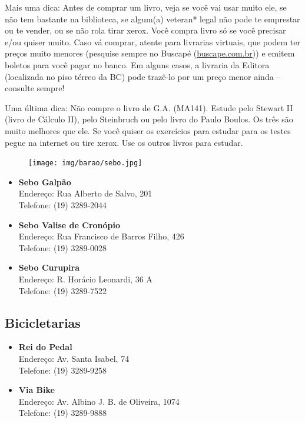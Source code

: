 Mais uma dica: Antes de comprar um livro, veja se você vai usar muito ele, se
não tem bastante na biblioteca, se algum(a) veteran* legal não pode te emprestar ou
te vender, ou se não rola tirar xerox. Você compra livro só se você precisar
e/ou quiser muito. Caso vá comprar, atente para livrarias virtuais, que podem
ter preços muito menores (pesquise sempre no Buscapé (\url{buscape.com.br})) e
emitem boletos para você pagar no banco.  Em alguns casos, a livraria da Editora
(localizada no piso térreo da BC) pode trazê-lo por um preço menor ainda --
consulte sempre!

Uma última dica: Não compre o livro de G.A. (MA141). Estude pelo Stewart II
(livro de Cálculo II), pelo Steinbruch ou pelo livro do Paulo Boulos. Os três
são muito melhores que ele. Se você quiser os exercícios para estudar para os
testes pegue na internet ou tire xerox. Use os outros livros para estudar.

\begin{figure}[h!]
    \centering
    \texttt{[image: img/barao/sebo.jpg]}
\end{figure}

\begin{itemize}
    \item   \textbf{Sebo Galpão}
        \\Endereço: Rua Alberto de Salvo, 201
        \\Telefone: (19) 3289-2044

    \item   \textbf{Sebo Valise de Cronópio}
        \\Endereço: Rua Francisco de Barros Filho, 426
        \\Telefone: (19) 3289-0028

    \item   \textbf{Sebo Curupira}
        \\Endereço: R. Horácio Leonardi, 36 A
        \\Telefone: (19) 3289-7522
\end{itemize}

\subsection{Bicicletarias}

\begin{itemize}
    \item   \textbf{Rei do Pedal}
        \\Endereço: Av. Santa Isabel, 74
        \\Telefone: (19) 3289-9258

    \item   \textbf{Via Bike}
        \\Endereço: Av. Albino J. B. de Oliveira, 1074
        \\Telefone: (19) 3289-9888
\end{itemize}

